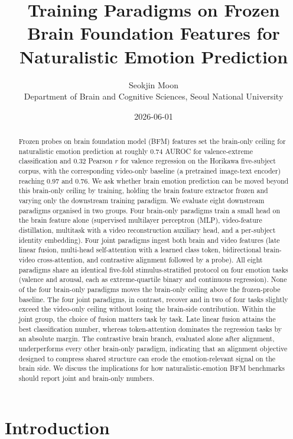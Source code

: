 \documentclass[11pt, a4paper]{article}
\title{\vspace{-2em}\textbf{Training Paradigms on Frozen Brain Foundation Features for
       Naturalistic Emotion Prediction}}
\author{Seokjin Moon \\
        \small Department of Brain and Cognitive Sciences, Seoul National University}
\date{2026-06-01}
\begin{document}
\maketitle
\thispagestyle{fancy}

\begin{abstract}
\noindent
Frozen probes on brain foundation model (BFM) features set the brain-only ceiling for
naturalistic emotion prediction at roughly $0.74$ AUROC for valence-extreme classification
and $0.32$ Pearson $r$ for valence regression on the Horikawa five-subject corpus, with
the corresponding video-only baseline (a pretrained image-text encoder) reaching $0.97$
and $0.76$. We ask whether brain emotion prediction can be moved beyond this brain-only
ceiling by training, holding the brain feature extractor frozen and varying only the
downstream training paradigm. We evaluate eight downstream paradigms organised in two
groups. Four brain-only paradigms train a small head on the brain feature alone
(supervised multilayer perceptron (MLP), video-feature distillation, multitask with a
video reconstruction auxiliary head, and a per-subject identity embedding). Four joint
paradigms ingest both brain and video features (late linear fusion, multi-head
self-attention with a learned class token, bidirectional brain-video cross-attention, and
contrastive alignment followed by a probe). All eight paradigms share an identical
five-fold stimulus-stratified protocol on four emotion tasks (valence and arousal, each as
extreme-quartile binary and continuous regression). None of the four brain-only paradigms
moves the brain-only ceiling above the frozen-probe baseline. The four joint paradigms,
in contrast, recover and in two of four tasks slightly exceed the video-only ceiling
without losing the brain-side contribution. Within the joint group, the choice of fusion
matters task by task. Late linear fusion attains the best classification number, whereas
token-attention dominates the regression tasks by an absolute margin. The contrastive
brain branch, evaluated alone after alignment, underperforms every other brain-only
paradigm, indicating that an alignment objective designed to compress shared structure
can erode the emotion-relevant signal on the brain side. We discuss the implications for
how naturalistic-emotion BFM benchmarks should report joint and brain-only numbers.
\end{abstract}

\section{Introduction}
\end{document}
